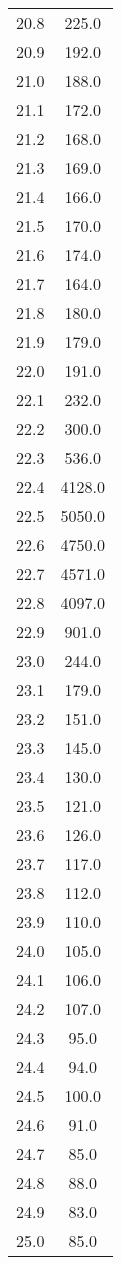 \begin{table}
\begin{minipage}{0.5\textwidth}
\begin{tabular}{c c}
20.8&	225.0\\
20.9&	192.0\\
21.0&	188.0\\
21.1&	172.0\\
21.2&	168.0\\
21.3&	169.0\\
21.4&	166.0\\
21.5&	170.0\\
21.6&	174.0\\
21.7&	164.0\\
21.8&	180.0\\
21.9&	179.0\\
22.0&	191.0\\
22.1&	232.0\\
22.2&	300.0\\
22.3&	536.0\\
22.4&	4128.0\\
22.5&	5050.0\\
22.6&	4750.0\\
22.7&	4571.0\\
22.8&	4097.0\\
22.9&	901.0\\
23.0&	244.0\\
23.1&	179.0\\
23.2&	151.0\\
23.3&	145.0\\
23.4&	130.0\\
23.5&	121.0\\
23.6&	126.0\\
23.7&	117.0\\
23.8&	112.0\\
23.9&	110.0\\
24.0&	105.0\\
24.1&	106.0\\
24.2&	107.0\\
24.3&	95.0\\
24.4&	94.0\\
24.5&	100.0\\
24.6&	91.0\\
24.7&	85.0\\
24.8&	88.0\\
24.9&	83.0\\
25.0&	85.0\\
    \bottomrule
\end{tabular}
\end{minipage}
\end{table}

